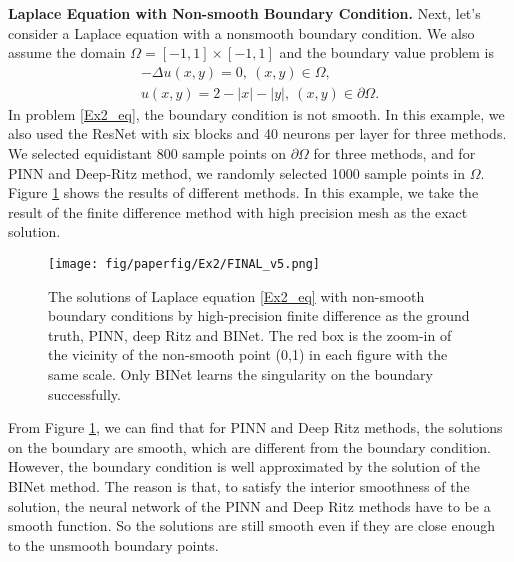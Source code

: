 \documentclass[hyperref]{article}
\numberwithin{equation}{section}
\theoremstyle{nonumberplain}
\begin{document}
	
	
	\noindent \textbf{Laplace Equation with Non-smooth Boundary Condition.} %
	Next, let's consider a Laplace equation with a nonsmooth boundary condition. We also assume the domain $\Omega=[-1,1]\times[-1,1]$ and the boundary value problem is
	\begin{equation}
		\begin{aligned}
			-\Delta u(x,y)=0,\ (x,y)\in\Omega,\\
			u(x,y) = 2-|x|-|y|, \ (x,y)\in\partial\Omega.
		\end{aligned}
		\label{Ex2_eq}
	\end{equation}
	In problem \eqref{Ex2_eq}, the boundary condition is not smooth. In this example, we also used the ResNet with six blocks and 40 neurons per layer for three methods. We selected equidistant 800 sample points on $\partial\Omega$ for three methods, and for PINN and Deep-Ritz method, we randomly selected 1000 sample points in $\Omega$. Figure \ref{f2} shows the results of different methods. In this example, we take the result of the finite difference method with high precision mesh as the exact solution.  
	
	\begin{figure}[t]
		\centering
		\centering
		\texttt{[image: fig/paperfig/Ex2/FINAL\_v5.png]}
		\centering
		\caption{The solutions of Laplace equation \eqref{Ex2_eq} with non-smooth boundary conditions by high-precision finite difference as the ground truth, PINN, deep Ritz and BINet. The red box is the zoom-in of the vicinity of the non-smooth point (0,1) in each figure with the same scale. Only BINet learns the singularity on the boundary successfully.}
		\label{f2}
	\end{figure}
	
	
	From Figure \ref{f2}, we can find that for PINN and Deep Ritz methods, the solutions on the boundary are smooth, which are different from the boundary condition. However, the boundary condition is well approximated by the solution of the BINet method. The reason is that, to satisfy the interior smoothness of the solution, the neural network of the PINN and Deep Ritz methods have to be a smooth function. So the solutions are still smooth even if they are close enough to the unsmooth boundary points.
	
\end{document}
